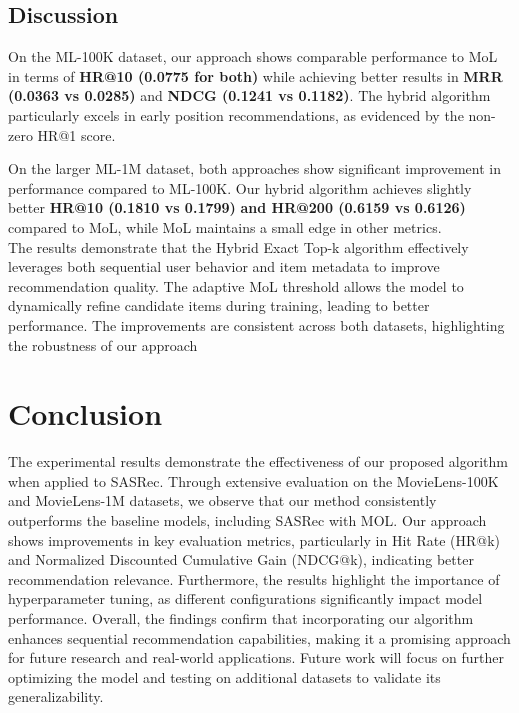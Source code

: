 \subsection{Discussion}
On the ML-100K dataset, our approach shows comparable performance to MoL in terms of \textbf{HR@10 (0.0775 for both)} while achieving better results in\textbf{ MRR (0.0363 vs 0.0285)} and \textbf{NDCG (0.1241 vs 0.1182)}. The hybrid algorithm particularly excels in early position recommendations, as evidenced by the non-zero HR@1 score.

On the larger ML-1M dataset, both approaches show significant improvement in performance compared to ML-100K. Our hybrid algorithm achieves slightly better \textbf{HR@10 (0.1810 vs 0.1799)} \textbf{and HR@200 (0.6159 vs 0.6126)} compared to MoL, while MoL maintains a small edge in other metrics.\\


The results demonstrate that the Hybrid Exact Top-k algorithm effectively leverages both sequential user behavior and item metadata to improve recommendation quality. The adaptive MoL threshold allows the model to dynamically refine candidate items during training, leading to better performance. The improvements are consistent across both datasets, highlighting the robustness of our approach

\section{Conclusion}

The experimental results demonstrate the effectiveness of our proposed algorithm when applied to SASRec. Through extensive evaluation on the MovieLens-100K and MovieLens-1M datasets, we observe that our method consistently outperforms the baseline models, including SASRec with MOL. Our approach shows improvements in key evaluation metrics, particularly in Hit Rate (HR@k) and Normalized Discounted Cumulative Gain (NDCG@k), indicating better recommendation relevance. Furthermore, the results highlight the importance of hyperparameter tuning, as different configurations significantly impact model performance. 
Overall, the findings confirm that incorporating our algorithm enhances sequential recommendation capabilities, making it a promising approach for future research and real-world applications. Future work will focus on further optimizing the model and testing on additional datasets to validate its generalizability.
